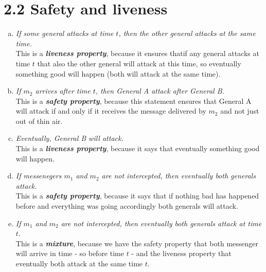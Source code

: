 \documentclass{article}
\begin{document}
	\section*{2.2 Safety and liveness}
	\begin{adjustwidth}{2em}{2em}	
		\begin{enumerate}[(a)]
			\item \textit{If some general attacks at time $t$, then the other general attacks at the same time.} \\
			This is a \textit{\textbf{liveness property}}, because it ensures thatif any general attacks at time $t$ that also the other general will attack at this time, so eventually something good will happen (both will attack at the same time).
			\item \textit{If $m_2$ arrives after time $t$, then General A attack after General B.} \\
			This is a \textit{\textbf{safety property}}, because this statement ensures that General A will attack if and only if it receives the message delivered by $m_2$ and not just out of thin air.
			\item \textit{Eventually, General B will attack.} \\
			This is a \textit{\textbf{liveness property}}, because it says that eventually something good will happen.
			\item \textit{If messenegers $m_1$ and $m_2$ are not intercepted, then eventually both generals attack.} \\
			This is a \textit{\textbf{safety property}}, because it says that if nothing bad has happened before and everything was going accordingly both generals will attack.
			\item \textit{If $m_1$ and $m_2$ are not intercepted, then eventually both generals attack at time $t$.} \\
			This is a \textit{\textbf{mixture}}, because we have the safety property that both messenger will arrive in time - so before time $t$ - and the liveness property that eventually both attack at the same time $t$.
		\end{enumerate}			
	\end{adjustwidth}
	
\end{document}

